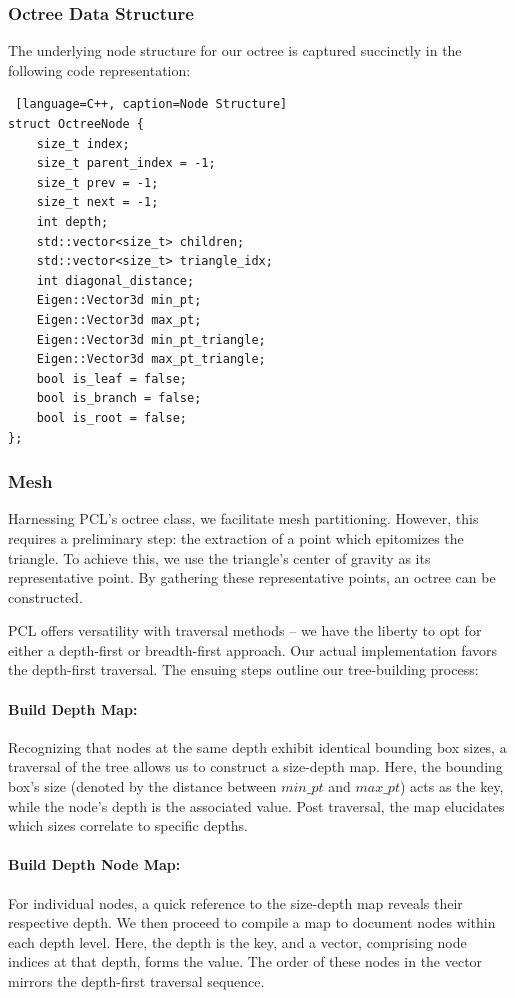 \documentclass[11pt, a4paper,oneside,chapterprefix=false]{scrbook}
\begin{document}
\subsubsection{Octree Data Structure}

The underlying node structure for our octree is captured succinctly in the following code representation:

\begin{lstlisting} [language=C++, caption=Node Structure]
struct OctreeNode {
    size_t index;
    size_t parent_index = -1;
    size_t prev = -1;
    size_t next = -1;
    int depth;
    std::vector<size_t> children;
    std::vector<size_t> triangle_idx;
    int diagonal_distance;
    Eigen::Vector3d min_pt;
    Eigen::Vector3d max_pt;
    Eigen::Vector3d min_pt_triangle;
    Eigen::Vector3d max_pt_triangle;
    bool is_leaf = false;
    bool is_branch = false;
    bool is_root = false;
};
\end{lstlisting}

\subsubsection{Mesh} \label{subsec:mesh octree}

Harnessing PCL's octree class, we facilitate mesh partitioning. However, this requires a preliminary step: the extraction of a point which epitomizes the triangle. To achieve this, we use the triangle's center of gravity as its representative point. By gathering these representative points, an octree can be constructed.

PCL offers versatility with traversal methods – we have the liberty to opt for either a depth-first or breadth-first approach. Our actual implementation favors the depth-first traversal. The ensuing steps outline our tree-building process:

\paragraph{Build Depth Map:} Recognizing that nodes at the same depth exhibit identical bounding box sizes, a traversal of the tree allows us to construct a size-depth map. Here, the bounding box's size (denoted by the distance between \( min\_pt \) and \( max\_pt \)) acts as the key, while the node's depth is the associated value. Post traversal, the map elucidates which sizes correlate to specific depths.

\paragraph{Build Depth Node Map:} For individual nodes, a quick reference to the size-depth map reveals their respective depth. We then proceed to compile a map to document nodes within each depth level. Here, the depth is the key, and a vector, comprising node indices at that depth, forms the value. The order of these nodes in the vector mirrors the depth-first traversal sequence.
\end{document}
